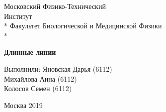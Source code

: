 \documentclass[12pt]{article}
\begin{document}
\begin{titlepage}
\newpage
\begin{center}
\vspace{1cm}%
\LARGE Московский Физико-Технический\\ Институт \\*
\vspace{5mm}
\large Факультет Биологической и Медицинской Физики\\*
\hrulefill %
\end{center}
\vspace{5em}
\begin{center}
\textbf{\huge Длинные линии} 
\end{center}
\vspace{20em}
\begin{flushright}
Выполнили: 
\hspace{1em}  
Яновская Дарья (6112)\\
Михайлова Анна (6112)\\
Колосов Семен (6112)\\
\vspace{1.5em}
\end{flushright}
\vspace{\fill}
\begin{center}
Москва 2019
\end{center}
\end{titlepage}
 
\newpage
\end{document}

